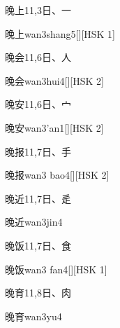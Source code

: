 \begin{Entry}{晚上}{11,3}{⽇、⼀}
  \begin{Phonetics}{晚上}{wan3shang5}[][HSK 1]
  \end{Phonetics}
\end{Entry}

\begin{Entry}{晚会}{11,6}{⽇、⼈}
  \begin{Phonetics}{晚会}{wan3hui4}[][HSK 2]
  \end{Phonetics}
\end{Entry}

\begin{Entry}{晚安}{11,6}{⽇、⼧}
  \begin{Phonetics}{晚安}{wan3'an1}[][HSK 2]
  \end{Phonetics}
\end{Entry}

\begin{Entry}{晚报}{11,7}{⽇、⼿}
  \begin{Phonetics}{晚报}{wan3 bao4}[][HSK 2]
  \end{Phonetics}
\end{Entry}

\begin{Entry}{晚近}{11,7}{⽇、⾡}
  \begin{Phonetics}{晚近}{wan3jin4}
  \end{Phonetics}
\end{Entry}

\begin{Entry}{晚饭}{11,7}{⽇、⾷}
  \begin{Phonetics}{晚饭}{wan3 fan4}[][HSK 1]
  \end{Phonetics}
\end{Entry}

\begin{Entry}{晚育}{11,8}{⽇、⾁}
  \begin{Phonetics}{晚育}{wan3yu4}
  \end{Phonetics}
\end{Entry}


